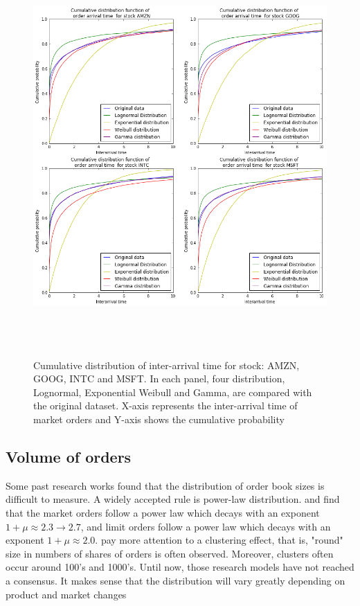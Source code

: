 \begin{figure}[hbtp]
  \begin{center}
    \includegraphics[width=6in, height=6in]{figures/arrival_time.png}
  \end{center}
\caption{Cumulative distribution of inter-arrival time for stock:  AMZN, GOOG, INTC and MSFT. In each panel, four distribution,  Lognormal,  Exponential Weibull and Gamma,  are compared with the original dataset. X-axis represents the inter-arrival time of market orders and Y-axis shows the cumulative probability } \label{fig: arrival}
\end{figure}


\subsection{Volume of orders}
Some past research works found that the distribution of order book sizes is difficult to measure. A widely accepted rule is power-law distribution.\cite{gopikrishnan2000statistical} and \cite{maslov2001price} find that the market orders follow a power law which decays with an exponent $1+\mu\approx2.3 \rightarrow 2.7$,  and limit orders follow a power law which decays with an exponent $1+\mu \approx 2.0$. \cite{challet2001analyzing} pay more attention to a clustering effect,  that is,  "round" size in numbers of shares of orders is often observed. Moreover,  clusters often occur around 100's and 1000's. Until now,  those research models have not reached a consensus. It makes sense that the distribution will vary greatly depending on product and market changes


